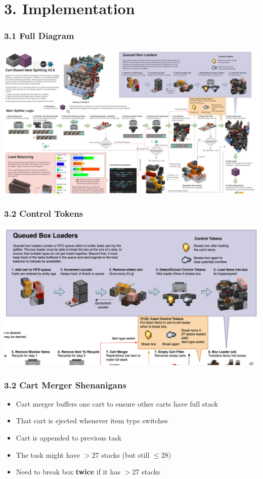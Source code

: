 \documentclass[aspectratio=169]{beamer}
\begin{document}
\section{3. Implementation}

{
\logo{}
\begin{frame}
    \frametitle{3.1 Full Diagram}
    \centering
    \includegraphics[width=0.75\paperwidth]{IdealSplitting3.png}
\end{frame}

\begin{frame}
    \frametitle{3.2 Control Tokens}
    \centering
    \includegraphics[width=0.85\paperwidth]{IdealSplitting3zoom.png}
\end{frame}
}

\begin{frame}
    \frametitle{3.2 Cart Merger Shenanigans}
    \begin{itemize}
        \item Cart merger buffers one cart to ensure other carts have full stack
        \item That cart is ejected whenever item type switches
        \item Cart is appended to previous task
        \item The task might have $>27$ stacks (but still $\leq28$)
        \item Need to break box \textbf{twice} if it has $>27$ stacks
    \end{itemize}

\end{frame}
\end{document}
